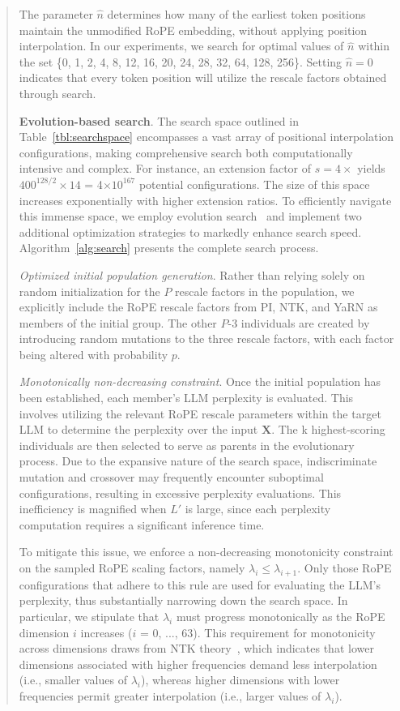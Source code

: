 \begin{abstract}
The parameter $\hat{n}$ determines how many of the earliest token positions maintain the unmodified RoPE embedding, without applying position interpolation. In our experiments, we search for optimal values of $\hat{n}$ within the set \{0, 1, 2, 4, 8, 12, 16, 20, 24, 28, 32, 64, 128, 256\}. Setting $\hat{n}=0$ indicates that every token position will utilize the rescale factors obtained through search.

\textbf{Evolution-based search}. The search space outlined in Table~\ref{tbl:searchspace} encompasses a vast array of positional interpolation configurations, making comprehensive search both computationally intensive and complex. For instance, an extension factor of $s=4\times$ yields $400^{128/2}\times14$ = 4$\times10^{167}$ potential configurations. The size of this space increases exponentially with higher extension ratios. To efficiently navigate this immense space, we employ evolution search~\cite{guo2020single} and implement two additional optimization strategies to markedly enhance search speed. Algorithm~\ref{alg:search} presents the complete search process.

\textit{Optimized initial population generation}. Rather than relying solely on random initialization for the $P$ rescale factors in the population, we explicitly include the RoPE rescale factors from PI, NTK, and YaRN as members of the initial group. The other $P$-3 individuals are created by introducing random mutations to the three rescale factors, with each factor being altered with probability $p$.

\textit{Monotonically non-decreasing constraint}. Once the initial population has been established, each member's LLM perplexity is evaluated. This involves utilizing the relevant RoPE rescale parameters within the target LLM to determine the perplexity over the input $\mathbf{X}$. The k highest-scoring individuals are then selected to serve as parents in the evolutionary process. Due to the expansive nature of the search space, indiscriminate mutation and crossover may frequently encounter suboptimal configurations, resulting in excessive perplexity evaluations. This inefficiency is magnified when $L'$ is large, since each perplexity computation requires a significant inference time.

To mitigate this issue, we enforce a non-decreasing monotonicity constraint on the sampled RoPE scaling factors, namely $\lambda_i \leq \lambda_{i+1}$. Only those RoPE configurations that adhere to this rule are used for evaluating the LLM's perplexity, thus substantially narrowing down the search space. In particular, we stipulate that $\lambda_i$ must progress monotonically as the RoPE dimension $i$ increases ($i$ = 0, ..., 63). This requirement for monotonicity across dimensions draws from NTK theory~\cite{jacot2018neural,tancik2020fourier,ntk}, which indicates that lower dimensions associated with higher frequencies demand less interpolation (i.e., smaller values of $\lambda_i$), whereas higher dimensions with lower frequencies permit greater interpolation (i.e., larger values of $\lambda_i$).


\end{abstract}
